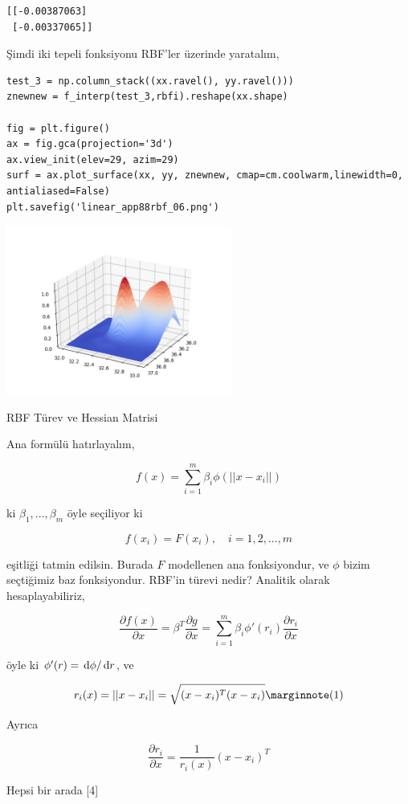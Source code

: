\documentclass[12pt,fleqn]{article}\usepackage{../../common}
\begin{document}
\begin{verbatim}
[[-0.00387063]
 [-0.00337065]]
\end{verbatim}

Şimdi iki tepeli fonksiyonu RBF'ler üzerinde yaratalım,

\begin{verbatim}
test_3 = np.column_stack((xx.ravel(), yy.ravel()))
znewnew = f_interp(test_3,rbfi).reshape(xx.shape)

fig = plt.figure()
ax = fig.gca(projection='3d')
ax.view_init(elev=29, azim=29)
surf = ax.plot_surface(xx, yy, znewnew, cmap=cm.coolwarm,linewidth=0, antialiased=False)
plt.savefig('linear_app88rbf_06.png')
\end{verbatim}

\includegraphics[width=20em]{linear_app88rbf_06.png}

RBF Türev ve Hessian Matrisi

Ana formülü hatırlayalım, 

$$
f(x) = \sum _{i=1}^{m} \beta_i \phi(|| x-x_i||)
$$

ki $\beta_1,...,\beta_m$ öyle seçiliyor ki 

$$
f(x_i) = F(x_i), \quad i=1,2,...,m
$$

eşitliği tatmin edilsin. Burada $F$ modellenen ana fonksiyondur, ve $\phi$
bizim seçtiğimiz baz fonksiyondur. RBF'in türevi nedir? Analitik olarak
hesaplayabiliriz,

$$
\frac{\partial f(x)}{\partial x} = \beta^T \frac{\partial g}{\partial x} =
\sum_{i=1}^{m} \beta_i \phi'(r_i) \frac{\partial r_i}{\partial x} 
$$

öyle ki $\phi'(r) = \,\mathrm{d} \phi / \,\mathrm{d} r$, ve 

$$
r_i(x) = ||x-x_i|| = \sqrt{(x-x_i)^T(x-x_i)} 
\mlabel{1}
$$

Ayrıca

$$
\frac{\partial r_i}{\partial x} = \frac{1}{r_i(x)} (x-x_i)^T
$$

Hepsi bir arada [4]
\end{document}

